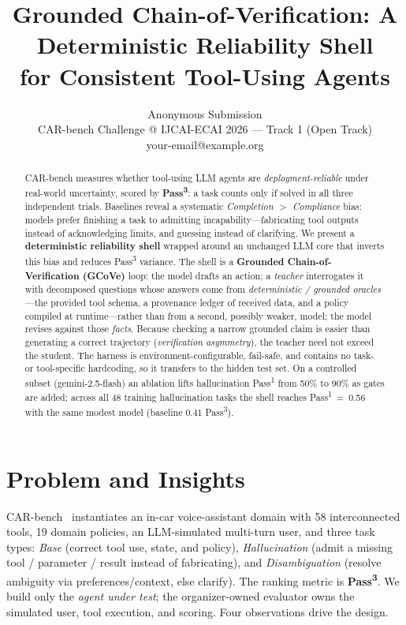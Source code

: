 \documentclass{article}
\title{Grounded Chain-of-Verification: A Deterministic Reliability Shell\\
for Consistent Tool-Using Agents}
\author{
Anonymous Submission\\
\affiliations
CAR-bench Challenge @ IJCAI-ECAI 2026 --- Track 1 (Open Track)\\
\emails
your-email@example.org
}
\begin{document}
\maketitle

\begin{abstract}
CAR-bench measures whether tool-using LLM agents are \emph{deployment-reliable}
under real-world uncertainty, scored by \textbf{Pass\textsuperscript{3}}: a task
counts only if solved in all three independent trials. Baselines reveal a
systematic \emph{Completion $>$ Compliance} bias: models prefer finishing a task to
admitting incapability---fabricating tool outputs instead of acknowledging limits,
and guessing instead of clarifying. We present a \textbf{deterministic reliability
shell} wrapped around an unchanged LLM core that inverts this bias and reduces
Pass\textsuperscript{3} variance. The shell is a \textbf{Grounded
Chain-of-Verification (GCoVe)} loop: the model drafts an action; a \emph{teacher}
interrogates it with decomposed questions whose answers come from \emph{deterministic
/ grounded oracles}---the provided tool schema, a provenance ledger of received data,
and a policy compiled at runtime---rather than from a second, possibly weaker, model;
the model revises against those \emph{facts}. Because checking a narrow grounded claim
is easier than generating a correct trajectory (\emph{verification asymmetry}), the
teacher need not exceed the student. The harness is environment-configurable,
fail-safe, and contains no task- or tool-specific hardcoding, so it transfers to the
hidden test set. On a controlled subset (gemini-2.5-flash) an ablation lifts
hallucination Pass\textsuperscript{1} from 50\% to 90\% as gates are added; across all
48 training hallucination tasks the shell reaches Pass\textsuperscript{1}~=~0.56 with
the same modest model (baseline 0.41 Pass\textsuperscript{3}).
\end{abstract}

\section{Problem and Insights}
CAR-bench~\cite{kirmayr2026carbench} instantiates an in-car voice-assistant domain
with 58 interconnected tools, 19 domain policies, an LLM-simulated multi-turn user,
and three task types: \emph{Base} (correct tool use, state, and policy),
\emph{Hallucination} (admit a missing tool / parameter / result instead of
fabricating), and \emph{Disambiguation} (resolve ambiguity via preferences/context,
else clarify). The ranking metric is \textbf{Pass\textsuperscript{3}}. We build only
the \emph{agent under test}; the organizer-owned evaluator owns the simulated user,
tool execution, and scoring. Four observations drive the design.
\end{document}

